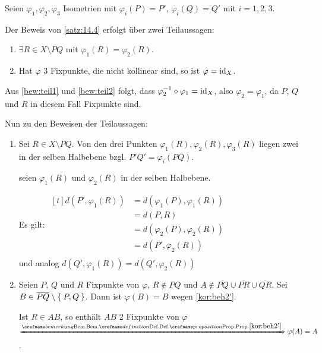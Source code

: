 \begin{beweis}
    Seien $\varphi_1, \varphi_2, \varphi_3$ Isometrien mit
    $\varphi_i(P) = P'$, $\varphi_i(Q) = Q'$ mit $i=1,2,3$.

    Der Beweis von \cref{satz:14.4} erfolgt über zwei Teilaussagen:

    \begin{enumerate}[label=(Teil \roman*),ref=(Teil \roman*)]
        \item \label{bew:teil1} $\exists R \in X \setminus PQ$ mit $\varphi_{1} (R) = \varphi_{2} (R)$.
        \item \label{bew:teil2} Hat $\varphi$ 3 Fixpunkte, die nicht kollinear sind, so ist $\varphi = \textnormal{id}_X$.
    \end{enumerate}

    Aus \ref{bew:teil1} und \ref{bew:teil2} folgt, dass $\varphi_2^{-1} \circ \varphi_1 = \textnormal{id}_X$,
    also $\varphi_2 = \varphi_1$, da $P$, $Q$ und $R$ in diesem Fall
    Fixpunkte sind.

    Nun zu den Beweisen der Teilaussagen:
    \begin{enumerate}[label=(Teil \roman*),ref=(Teil \roman*)]
        \item Sei $R \in X \setminus PQ$. Von den drei Punkten 
            $\varphi_1(R), \varphi_2(R), \varphi_3(R)$ liegen zwei
            in der selben Halbebene bzgl. $P'Q' = \varphi_i(PQ)$.

            \Obda seien $\varphi_1(R)$ und $\varphi_2(R)$ in der 
            selben Halbebene.

            Es gilt: $\begin{aligned}[t]
                d(P', \varphi_1(R)) &= d(\varphi_1(P), \varphi_1(R))\\
                    &= d(P, R)\\
                    &= d(\varphi_2(P), \varphi_2(R))\\
                    &= d(P', \varphi_2(R))\\
            \end{aligned}$\\
            und analog $d(Q', \varphi_1(R)) = d(Q', \varphi_2(R))$
        \item Seien $P$, $Q$ und $R$ Fixpunkte von $\varphi$, $R \notin PQ$
        und $A \notin \overline{PQ} \cup \overline{PR} \cup \overline{QR}$.
        Sei $B \in \overline{PQ} \setminus \Set{P, Q}$. Dann ist
        $\varphi(B) = B$ wegen \cref{kor:beh2'}.

        Ist $R \in AB$, so enthält $AB$ 2 Fixpunkte von $\varphi$
        $\xRightarrow{\crefabbr{kor:beh2'}} \varphi(A) = A$.


\end{enumerate}
\end{beweis}
